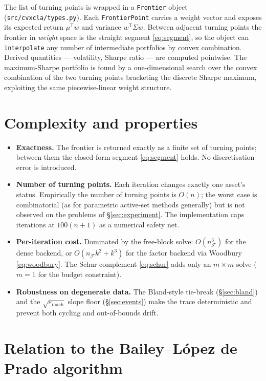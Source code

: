 \documentclass[11pt]{article}
\newcommand{\Sig}{\Sigma}
\newcommand{\F}{\mathcal{F}}        %
\newcommand{\trans}{^{\mathsf{T}}}
\begin{document}
The list of turning points is wrapped in a \texttt{Frontier} object
(\texttt{src/cvxcla/types.py}). Each \texttt{FrontierPoint} carries a weight vector and
exposes its expected return $\mu\trans w$ and variance $w\trans\Sig w$. Between adjacent
turning points the frontier in \emph{weight} space is the straight segment
\eqref{eq:segment}, so the object can \texttt{interpolate} any number of intermediate
portfolios by convex combination. Derived quantities --- volatility, Sharpe ratio --- are
computed pointwise. The maximum-Sharpe portfolio is found by a one-dimensional search
over the convex combination of the two turning points bracketing the discrete Sharpe
maximum, exploiting the same piecewise-linear weight structure.

\section{Complexity and properties}

\begin{itemize}
\item \textbf{Exactness.} The frontier is returned exactly as a finite set of turning
points; between them the closed-form segment \eqref{eq:segment} holds. No
discretisation error is introduced.

\item \textbf{Number of turning points.} Each iteration changes exactly one asset's
status. Empirically the number of turning points is $O(n)$; the worst case is
combinatorial (as for parametric active-set methods generally) but is not observed on
the problems of \S\ref{sec:experiment}. The implementation caps iterations at
$100(n+1)$ as a numerical safety net.

\item \textbf{Per-iteration cost.} Dominated by the free-block solve: $O(n_\F^3)$ for
the dense backend, or $O(n_\F k^2 + k^3)$ for the factor backend via Woodbury
\eqref{eq:woodbury}. The Schur complement \eqref{eq:schur} adds only an $m\times m$
solve ($m=1$ for the budget constraint).

\item \textbf{Robustness on degenerate data.} The Bland-style tie-break
(\S\ref{sec:bland}) and the $\sqrt{\varepsilon_{\text{mach}}}$ slope floor
(\S\ref{sec:events}) make the trace deterministic and prevent both cycling and
out-of-bounds drift.
\end{itemize}

\section{Relation to the Bailey--L\'opez de Prado algorithm}
\label{sec:bailey}
\end{document}
